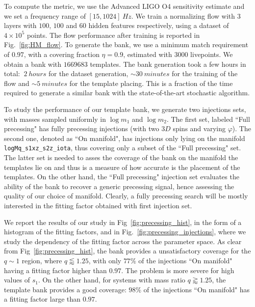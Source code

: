 \documentclass[twocolumn,showpacs,preprintnumbers,nofootinbib,prd,
superscriptaddress,10pt]{revtex4-2}
\begin{document}
To compute the metric, we use the Advanced LIGO O4 sensitivity estimate and we set a frequency range of $[15, 1024] \SI{}{Hz}$.
We train a normalizing flow with $3$ layers with $100$, $100$ and $60$ hidden features respectively, using a dataset of $4\times 10^5$ points.
The flow performance after training is reported in Fig.~\ref{fig:HM_flow}.
To generate the bank, we use a minimum match requirement of $0.97$, with a covering fraction $\eta = 0.9$, estimated with $3000$ livepoints.
We obtain a bank with $1669683$ templates.
The bank generation took a few hours in total: $~\SI{2}{hours}$ for the dataset generation, $\sim \SI{30}{minutes}$ for the training of the flow and $\sim \SI{5}{minutes}$ for the template placing. This is a fraction of the time required to generate a similar bank with the state-of-the-art stochastic algorithm.

To study the performance of our template bank, we generate two injections sets, with masses sampled uniformly in $\log m_1$ and $\log m_2$.
The first set, labeled ``Full precessing" has fully precessing injections (with two $3D$ spins and varying $\varphi$). The second one, denoted as ``On manifold", has injections only lying on the manifold \texttt{logMq\_s1xz\_s2z\_iota}, thus covering only a subset of the ``Full precessing" set.
The latter set is needed to asses the coverage of the bank on the manifold the templates lie on and thus is a measure of how accurate is the placement of the templates.
On the other hand, the ``Full precessing" injection set evaluates the ability of the bank to recover a generic precessing signal, hence assessing the quality of our choice of manifold.
Clearly, a fully precessing search will be mostly interested in the fitting factor obtained with first injection set.

We report the results of our study in Fig~\ref{fig:precessing_hist}, in the form of a histogram of the fitting factors, and in Fig.~\ref{fig:precessing_injections}, where we study the dependency of the fitting factor across the parameter space.
As clear from Fig~\ref{fig:precessing_hist}, the bank provides a unsatisfactory coverage for the $q\sim 1$ region, where $q \lessapprox 1.25$, with only $77\%$ of the injections ``On manifold" having a fitting factor higher than $0.97$. The problem is more severe for high values of $s_1$.
On the other hand, for systems with mass ratio $q \gtrapprox 1.25$, the template bank provides a good coverage: $98\%$ of the injections ``On manifold" has a fitting factor large than $0.97$.
\end{document}
